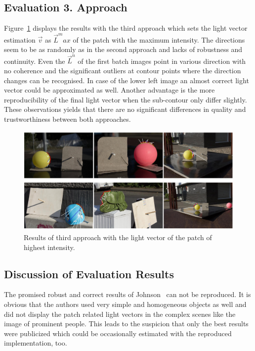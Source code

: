 \subsection{Evaluation 3. Approach}
Figure~\ref{fig:highRes} displays the results with the third approach which sets the light vector estimation $\vec{v}$ as  $\vec{L}^max$ of the patch with the maximum intensity. The directions seem to be as randomly as in the second approach and lacks of robustness and continuity. Even the $\vec{L}^n$ of the first batch images point in various direction with no coherence and the significant outliers at contour points where the direction changes can be recognised. In case of the lower left image an almost correct light vector could be approximated as well. Another advantage is the more reproducibility of the final light vector when the sub-contour only differ slightly. These observations yields that there are no significant differences in quality and trustworthiness between both approaches. 
\begin{figure}[H] 
	\center 
	\includegraphics[width=\linewidth]{Images/High_res.jpg}
	\caption[Bildunterschrift]{Results of third approach with the light vector of the patch of highest intensity.}	
	\label{fig:highRes}	
\end{figure}
\subsection{Discussion of Evaluation Results}

The promised robust and correct results of Johnson~\cite{Johnson} can not be reproduced. It is obvious that the authors used very simple and homogeneous objects as well and did not display the patch related light vectors in the complex scenes like the image of prominent people. This leads to the suspicion that only the best results were publicized which could be occasionally estimated with the reproduced implementation, too. 

